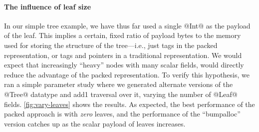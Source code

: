 \documentclass[a4paper,english]{lipics-v2016}
\begin{document}
\paragraph*{The influence of leaf size}

In our simple tree example, we have thus far used a single @Int@ as the payload
of the leaf.  This implies a certain, fixed ratio of payload bytes to the memory
used for storing the structure of the tree---i.e., just tags in the packed
representation, or tags and pointers in a traditional representation.
%
We would expect that increasingly ``heavy'' nodes with many scalar fields, would
directly reduce the advantage of the packed representation.
To verify this hypothesis, we ran a simple parameter study where we generated
alternate versions of the @Tree@ datatype and add1 traversal over it, varying
the number of @Leaf@ fields.
\cref{fig:vary-leaves} shows the results.
%
As expected, the best performance of the packed approach is with {\em zero}
leaves, and the performance of the ``bumpalloc'' version catches up as the
scalar payload of leaves increases.
\end{document}
